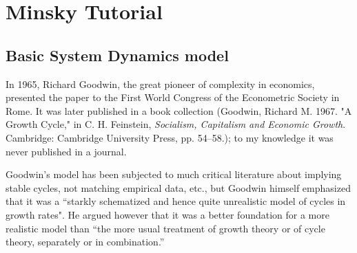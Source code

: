 
\chapter{Minsky Tutorial}

\label{tutorial-Minsky}

\section{Basic System Dynamics model}

In 1965, Richard Goodwin, the great pioneer of complexity in economics,
presented the paper 
to the First World Congress of the Econometric Society in Rome. It
was later published in a book collection (Goodwin, Richard M. 1967.
"A Growth Cycle," in C. H. Feinstein, {\em Socialism, Capitalism
and Economic Growth}. Cambridge: Cambridge University Press, pp.
54--58.); to my knowledge it was never published in a journal.

Goodwin's model has been subjected to much critical literature about
implying stable cycles, not matching empirical data, etc., but Goodwin
himself emphasized that it was a ``starkly schematized and hence
quite unrealistic model of cycles in growth rates". He argued however
that it was a better foundation for a more realistic model than ``the
more usual treatment of growth theory or of cycle theory, separately
or in combination.''

